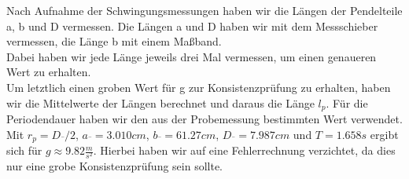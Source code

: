 Nach Aufnahme der Schwingungsmessungen haben wir die Längen der Pendelteile a, b und D vermessen. Die Längen a und D haben wir mit dem Messschieber vermessen, die Länge b mit einem Maßband.\\ 
Dabei haben wir jede Länge jeweils drei Mal vermessen, um einen genaueren Wert zu erhalten.\\
Um letztlich einen groben Wert für g zur Konsistenzprüfung zu erhalten, haben wir die Mittelwerte der Längen berechnet und daraus die Länge $l_p$. Für die Periodendauer haben wir den aus der Probemessung bestimmten Wert verwendet. Mit $r_p = D\overline{}/2$,  $a\overline{}=3.010cm$, $b\overline{}=61.27cm$, $D\overline{}=7.987cm$ und $T=1.658s$ ergibt sich für $g\approx9.82 \frac{m}{s^2}$. Hierbei haben wir auf eine Fehlerrechnung verzichtet, da dies nur eine grobe Konsistenzprüfung sein sollte. 

